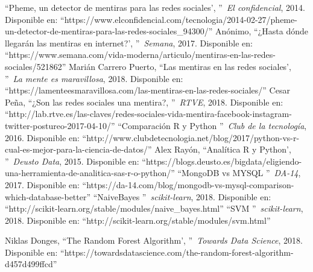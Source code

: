 \documentclass[../all.tex]{subfiles}
\begin{document}
\begin{thebibliography}{37}
		\textquotedblleft Pheme, un detector de mentiras para las redes sociales',
		\textquotedblright\ \textit{El confidencial},
		2014.
		Disponible en: ``https://www.elconfidencial.com/tecnologia/2014-02-27/pheme-un-detector-de-mentiras-para-las-redes-sociales\_94300/''
		Anónimo, 
		\textquotedblleft ¿Hasta dónde llegarán las mentiras en internet?',
		\textquotedblright\ \textit{Semana},
		2017.
		Disponible en: ``https://www.semana.com/vida-moderna/articulo/mentiras-en-las-redes-sociales/521862''
		Marián Carrero Puerto, 
		\textquotedblleft Las mentiras en las redes sociales',
		\textquotedblright\ \textit{La mente es maravillosa},
		2018.
		Disponible en: ``https://lamenteesmaravillosa.com/las-mentiras-en-las-redes-sociales/''
			Cesar Peña, 
			\textquotedblleft ¿Son las redes sociales una mentira?,
			\textquotedblright\ \textit{RTVE},
			2018.
			Disponible en: ``http://lab.rtve.es/las-claves/redes-sociales-vida-mentira-facebook-instagram-twitter-postureo-2017-04-10/''
			\textquotedblleft Comparación R y Python
			\textquotedblright\, \textit{Club de la tecnología},
			2016.
			Disponible en: ``http://www.clubdetecnologia.net/blog/2017/python-vs-r-cual-es-mejor-para-la-ciencia-de-datos/''
			Alex Rayón, 
			\textquotedblleft Analítica R y Python',
			\textquotedblright\ \textit{Deusto Data},
			2015.
			Disponible en: ``https://blogs.deusto.es/bigdata/eligiendo-una-herramienta-de-analitica-sas-r-o-python/''
			\textquotedblleft MongoDB vs MYSQL
			\textquotedblright\, \textit{DA-14},
			2017.
			Disponible en: ``https://da-14.com/blog/mongodb-vs-mysql-comparison-which-database-better''
			\textquotedblleft NaiveBayes
			\textquotedblright\, \textit{scikit-learn},
			2018.
			Disponible en: ``http://scikit-learn.org/stable/modules/naive\_bayes.html''
			\textquotedblleft SVM
			\textquotedblright\, \textit{scikit-learn},
			2018.
			Disponible en: ``http://scikit-learn.org/stable/modules/svm.html''
			
			Niklas Donges, 
			\textquotedblleft The Random Forest Algorithm',
			\textquotedblright\ \textit{Towards Data Science},
			2018.
			Disponible en: ``https://towardsdatascience.com/the-random-forest-algorithm-d457d499ffcd''
		

\end{thebibliography}
\end{document}
